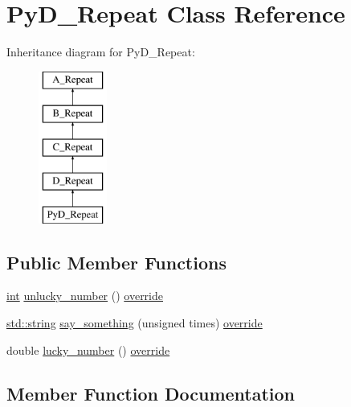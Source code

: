 \hypertarget{class_py_d___repeat}{}\section{Py\+D\+\_\+\+Repeat Class Reference}
\label{class_py_d___repeat}
Inheritance diagram for Py\+D\+\_\+\+Repeat\+:\begin{figure}[H]
\begin{center}
\leavevmode
\includegraphics[height=5.000000cm]{class_py_d___repeat}
\end{center}
\end{figure}
\subsection*{Public Member Functions}
\begin{DoxyCompactItemize}
\item 
\mbox{\hyperlink{warnings_8h_a74f207b5aa4ba51c3a2ad59b219a423b}{int}} \mbox{\hyperlink{class_py_d___repeat_adcceabf90f371185b70cc1d81286b127}{unlucky\+\_\+number}} () \mbox{\hyperlink{dictobject_8h_a055cf4fd16bde9bce026127362cee1a3}{override}}
\item 
\mbox{\hyperlink{_s_d_l__opengl__glext_8h_ab4ccfaa8ab0e1afaae94dc96ef52dde1}{std\+::string}} \mbox{\hyperlink{class_py_d___repeat_ac308065a93487157a41032bf96c13d64}{say\+\_\+something}} (unsigned times) \mbox{\hyperlink{dictobject_8h_a055cf4fd16bde9bce026127362cee1a3}{override}}
\item 
double \mbox{\hyperlink{class_py_d___repeat_af1325f719594f3df3812a95eb44efc5e}{lucky\+\_\+number}} () \mbox{\hyperlink{dictobject_8h_a055cf4fd16bde9bce026127362cee1a3}{override}}
\end{DoxyCompactItemize}


\subsection{Member Function Documentation}
\mbox{\label{class_py_d___repeat_af1325f719594f3df3812a95eb44efc5e}} 
